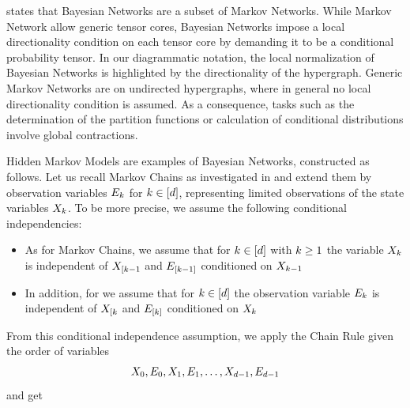  states that Bayesian Networks are a subset of Markov Networks.
While Markov Network allow generic tensor cores, Bayesian Networks impose a local directionality condition on each tensor core by demanding it to be a conditional probability tensor.
In our diagrammatic notation, the local normalization of Bayesian Networks is highlighted by the directionality of the hypergraph.
Generic Markov Networks are on undirected hypergraphs, where in general no local directionality condition is assumed.
As a consequence, tasks such as the determination of the partition functions or calculation of conditional distributions involve global contractions.


\begin{example}
    Hidden Markov Models are examples of Bayesian Networks, constructed as follows.
    Let us recall Markov Chains as investigated in  and extend them by observation variables $E_{k}$ for $k\in[d]$, representing limited observations of the state variables $X_{k}$.
    To be more precise, we assume the following conditional independencies:
    \begin{itemize}
        \item As for Markov Chains, we assume that for $k\in[d]$ with $k\geq1$ the variable $X_{k}$ is independent of $X_{[k-1}$ and $E_{[k-1]}$ conditioned on $X_{k-1}$
        \item In addition, for we assume that for $k\in[d]$ the observation variable $E_{k}$ is independent of $X_{[k}$ and $E_{[k]}$ conditioned on $X_{k}$
    \end{itemize}
    From this conditional independence assumption, we apply the Chain Rule  given the order of variables
    \begin{align*}
        X_{0},E_{0},X_{1},E_{1},\ldots,X_{d-1},E_{d-1}
    \end{align*}
    and get
    \begin{align*}

\end{align*}
\end{example}
